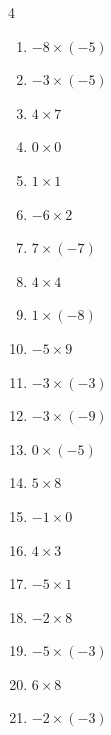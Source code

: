 \begin{multicols}{4}
\begin{enumerate}
  \item $-8\times (-5)$
        \phantom{$=40$}

  \item $-3\times (-5)$
        \phantom{$=15$}

  \item $4\times 7$
        \phantom{$=28$}

  \item $0\times 0$
        \phantom{$=0$}

  \item $1\times 1$
        \phantom{$=1$}

  \item $-6\times 2$
        \phantom{$=-12$}

  \item $7\times (-7)$
        \phantom{$=-49$}

  \item $4\times 4$
        \phantom{$=16$}

  \item $1\times (-8)$
        \phantom{$=-8$}

  \item $-5\times 9$
        \phantom{$=-45$}

  \item $-3\times (-3)$
        \phantom{$=9$}

  \item $-3\times (-9)$
        \phantom{$=27$}

  \item $0\times (-5)$
        \phantom{$=0$}

  \item $5\times 8$
        \phantom{$=40$}

  \item $-1\times 0$
        \phantom{$=0$}

  \item $4\times 3$
        \phantom{$=12$}

  \item $-5\times 1$
        \phantom{$=-5$}

  \item $-2\times 8$
        \phantom{$=-16$}

  \item $-5\times (-3)$
        \phantom{$=15$}

  \item $6\times 8$
        \phantom{$=48$}

  \item $-2\times (-3)$
        \phantom{$=6$}


\end{enumerate}
\end{multicols}

